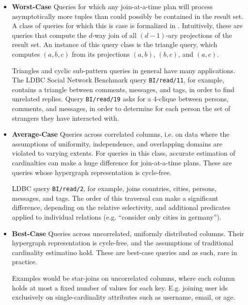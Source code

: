 \documentclass[../catalog.tex]{subfiles}
\begin{document}
\begin{itemize}

  \item \textbf{Worst-Case} Queries for which any join-at-a-time plan
    will process asymptotically more tuples than could possibly be
    contained in the result set. A class of queries for which this is
    case is formalized in \cite{ngo2012worst}. Intuitively, these are
    queries that compute the $d$-way join of all $(d-1)$-ary
    projections of the result set. An instance of this query class is
    the triangle query, which computes $(a,b,c)$ from its projections
    $(a,b)$, $(b,c)$, and $(a,c)$.

    Triangles and cyclic sub-pattern queries in general have many
    applications. The LDBC Social Network Benchmark query
    \texttt{BI/read/11}, for example, contains a triangle between
    comments, messages, and tags, in order to find unrelated
    replies. Query \texttt{BI/read/19} asks for a 4-clique between
    persons, comments, and messages, in order to determine for each
    person the set of strangers they have interacted with.

  \item \textbf{Average-Case} Queries across correlated columns,
    i.e. on data where the assumptions of uniformity, independence,
    and overlapping domains are violated to varying extents. For
    queries in this class, accurate estimation of cardinalties can
    make a huge difference for join-at-a-time plans. These are queries
    whose hypergraph representation is cycle-free.

    LDBC query \texttt{BI/read/2}, for example, joins countries,
    cities, persons, messages, and tags. The order of this traversal
    can make a significant difference, depending on the relative
    selectivity, and additional predicates applied to individual
    relations (e.g. ``consider only cities in germany'').

  \item \textbf{Best-Case} Queries across uncorrelated, uniformly
    distributed columns. Their hypergraph representation is
    cycle-free, and the assumptions of traditional cardinality
    estimatino hold. These are best-case queries and as such, rare in
    practice.

    Examples would be star-joins on uncorrelated columns, where each
    column holds at most a fixed number of values for each
    key. E.g. joining user ids exclusively on single-cardinality
    attributes such as username, email, or age.
    
\end{itemize}
\end{document}
